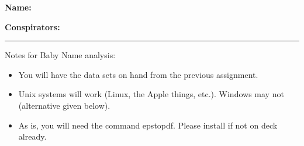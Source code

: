 \textbf{Name:} \\

\medskip

\textbf{Conspirators:} 

\medskip
\medskip

\hrule

\medskip














Notes for Baby Name analysis:

\begin{itemize}
\item
  You will have the data sets on hand from the previous assignment.
\item 
  Unix systems will work (Linux, the Apple things, etc.). Windows may not (alternative given below).
\item 
  As is, you will need the command epstopdf. Please install if not on deck already.
\end{itemize}


